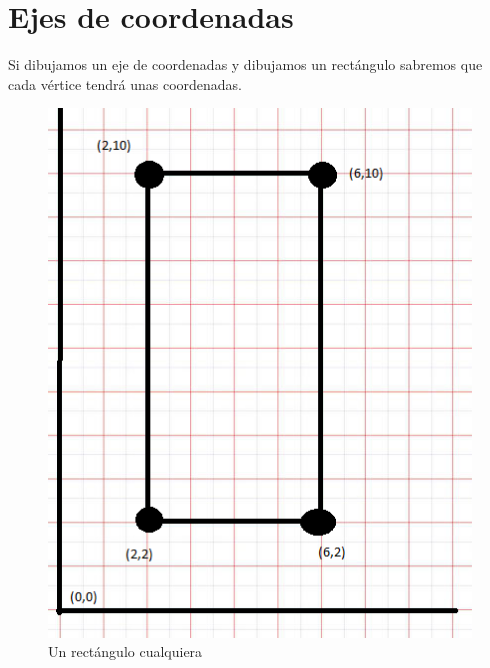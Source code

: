 \documentclass[a4paper,12pt,spanish]{sphinxmanual}
\begin{document}
\section{Ejes de coordenadas}
\label{cap2opengl:ejes-de-coordenadas}
Si dibujamos un eje de coordenadas y dibujamos un rectángulo sabremos que cada vértice tendrá unas coordenadas.
\begin{figure}[htbp]
\centering
\capstart

\includegraphics{ejerectangulo.png}
\caption{Un rectángulo cualquiera}\end{figure}
\end{document}
